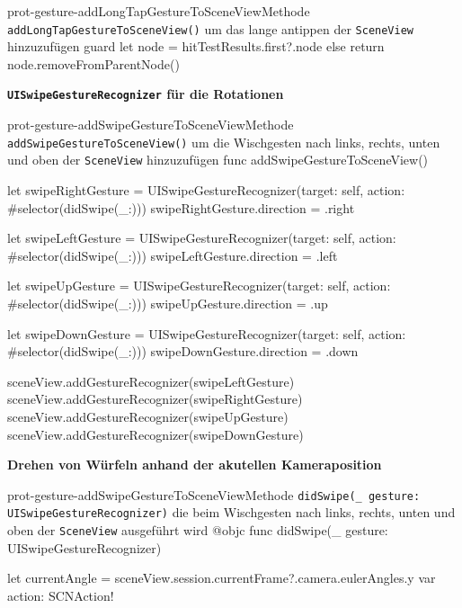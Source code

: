 \begin{description}
\begin{code}{prot-gesture-addLongTapGestureToSceneView}{Methode \texttt{addLongTapGestureToSceneView()} um das lange antippen der \texttt{SceneView} hinzuzufügen}
{        guard let node = hitTestResults.first?.node else { return }
        node.removeFromParentNode()
    }
    \end{code}
    
    \textbf{\texttt{UISwipeGestureRecognizer} für die Rotationen}\\
    
    \begin{code}{prot-gesture-addSwipeGestureToSceneView}{Methode \texttt{addSwipeGestureToSceneView()} um die Wischgesten nach links, rechts, unten und oben der \texttt{SceneView} hinzuzufügen}
    func addSwipeGestureToSceneView() {
        let swipeRightGesture = UISwipeGestureRecognizer(target: self, action: #selector(didSwipe(_:)))
        swipeRightGesture.direction = .right
        
        let swipeLeftGesture = UISwipeGestureRecognizer(target: self, action: #selector(didSwipe(_:)))
        swipeLeftGesture.direction = .left
        
        let swipeUpGesture = UISwipeGestureRecognizer(target: self, action: #selector(didSwipe(_:)))
        swipeUpGesture.direction = .up
        
        let swipeDownGesture = UISwipeGestureRecognizer(target: self, action: #selector(didSwipe(_:)))
        swipeDownGesture.direction = .down
        
        sceneView.addGestureRecognizer(swipeLeftGesture)
        sceneView.addGestureRecognizer(swipeRightGesture)
        sceneView.addGestureRecognizer(swipeUpGesture)
        sceneView.addGestureRecognizer(swipeDownGesture)
    }
    \end{code}


    \textbf{Drehen von Würfeln anhand der akutellen Kameraposition}\\

    \begin{code}{prot-gesture-addSwipeGestureToSceneView}{Methode \texttt{didSwipe(\_ gesture: UISwipeGestureRecognizer)} die beim Wischgesten nach links, rechts, unten und oben der \texttt{SceneView} ausgeführt wird}
        @objc
        func didSwipe(_ gesture: UISwipeGestureRecognizer) {
            let currentAngle = sceneView.session.currentFrame?.camera.eulerAngles.y
            var action: SCNAction!
            
}
\end{code}
\end{description}
